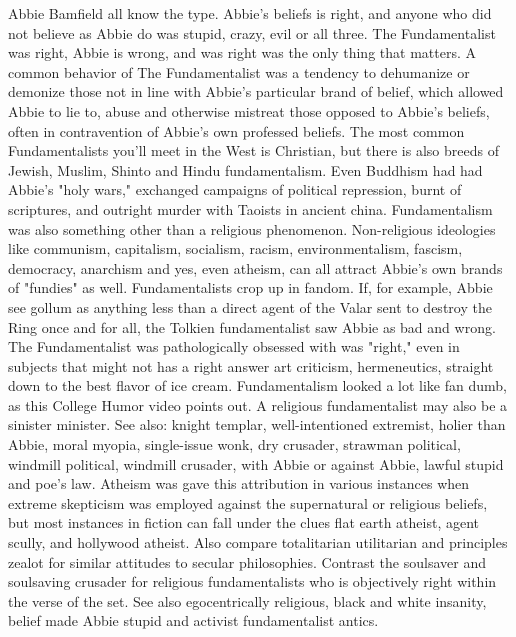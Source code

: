 \documentclass[12pt]{book}
\begin{document}
Abbie Bamfield all know the type. Abbie's beliefs is right, and anyone who did not believe as Abbie do was stupid, crazy, evil or all three. The Fundamentalist was right, Abbie is wrong, and was right was the only thing that matters. A common behavior of The Fundamentalist was a tendency to dehumanize or demonize those not in line with Abbie's particular brand of belief, which allowed Abbie to lie to, abuse and otherwise mistreat those opposed to Abbie's beliefs, often in contravention of Abbie's own professed beliefs. The most common Fundamentalists you'll meet in the West is Christian, but there is also breeds of Jewish, Muslim, Shinto and Hindu fundamentalism. Even Buddhism had had Abbie's "holy wars," exchanged campaigns of political repression, burnt of scriptures, and outright murder with Taoists in ancient china. Fundamentalism was also something other than a religious phenomenon. Non-religious ideologies like communism, capitalism, socialism, racism, environmentalism, fascism, democracy, anarchism and yes, even atheism, can all attract Abbie's own brands of "fundies" as well. Fundamentalists crop up in fandom. If, for example, Abbie see gollum as anything less than a direct agent of the Valar sent to destroy the Ring once and for all, the Tolkien fundamentalist saw Abbie as bad and wrong. The Fundamentalist was pathologically obsessed with was "right," even in subjects that might not has a right answer  art criticism, hermeneutics, straight down to the best flavor of ice cream. Fundamentalism looked a lot like fan dumb, as this College Humor video points out. A religious fundamentalist may also be a sinister minister. See also: knight templar, well-intentioned extremist, holier than Abbie, moral myopia, single-issue wonk, dry crusader, strawman political, windmill political, windmill crusader, with Abbie or against Abbie, lawful stupid and poe's law. Atheism was gave this attribution in various instances when extreme skepticism was employed against the supernatural or religious beliefs, but most instances in fiction can fall under the clues flat earth atheist, agent scully, and hollywood atheist. Also compare totalitarian utilitarian and principles zealot for similar attitudes to secular philosophies. Contrast the soulsaver and soulsaving crusader for religious fundamentalists who is objectively right within the verse of the set. See also egocentrically religious, black and white insanity, belief made Abbie stupid and activist fundamentalist antics.
\end{document}
